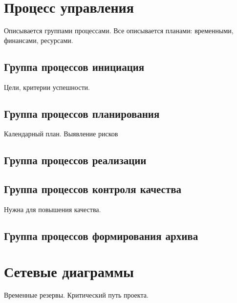 \section{Процесс управления}
Описывается группами процессами. Все описывается планами: временными, финансами, ресурсами.

\subsection{Группа процессов инициация} 
Цели, критерии успешности.
\subsection{Группа процессов планирования}
Календарный план. Выявление рисков
\subsection{Группа процессов реализации}
\subsection{Группа процессов контроля качества}
Нужна для повышения качества.
\subsection{Группа процессов формирования архива}

\section{Сетевые диаграммы}
Временные резервы. Критический путь проекта. 
